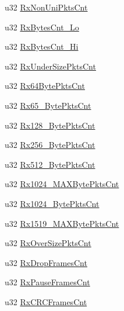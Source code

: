\begin{DoxyCompactItemize}
\item 
u32 \hyperlink{structECNT__SWITCHMGR__PORT__STATISTICS_af4107511aa6416ada6fb8f5ab804a76a}{Rx\+Non\+Uni\+Pkts\+Cnt}
\item 
u32 \hyperlink{structECNT__SWITCHMGR__PORT__STATISTICS_ac0b45dff11b31df7bf4781557fb20864}{Rx\+Bytes\+Cnt\+\_\+\+Lo}
\item 
u32 \hyperlink{structECNT__SWITCHMGR__PORT__STATISTICS_aa9bd997fe6eee98f0575efff84ddeb61}{Rx\+Bytes\+Cnt\+\_\+\+Hi}
\item 
u32 \hyperlink{structECNT__SWITCHMGR__PORT__STATISTICS_a60daa229a8191be4fa004277f547d19e}{Rx\+Under\+Size\+Pkts\+Cnt}
\item 
u32 \hyperlink{structECNT__SWITCHMGR__PORT__STATISTICS_af7bb439fdfa25e6e187d7aaf28cd3b13}{Rx64\+Byte\+Pkts\+Cnt}
\item 
u32 \hyperlink{structECNT__SWITCHMGR__PORT__STATISTICS_a7ab2ba04bc64db7762a64ca216f9b1f3}{Rx65\+\_\+Byte\+Pkts\+Cnt}
\item 
u32 \hyperlink{structECNT__SWITCHMGR__PORT__STATISTICS_a40cd08f32b4d07f8e2309d2a43cc5785}{Rx128\+\_\+Byte\+Pkts\+Cnt}
\item 
u32 \hyperlink{structECNT__SWITCHMGR__PORT__STATISTICS_a4f08ec2aeebcdcd852207076f82bf3e0}{Rx256\+\_\+Byte\+Pkts\+Cnt}
\item 
u32 \hyperlink{structECNT__SWITCHMGR__PORT__STATISTICS_a59398f2577cdade66f21c31d18ba17bb}{Rx512\+\_\+Byte\+Pkts\+Cnt}
\item 
u32 \hyperlink{structECNT__SWITCHMGR__PORT__STATISTICS_a2d22ba12b25939283bc594fec05e79cc}{Rx1024\+\_\+\+M\+A\+X\+Byte\+Pkts\+Cnt}
\item 
u32 \hyperlink{structECNT__SWITCHMGR__PORT__STATISTICS_afafbeaf98c99de7d49e600256b0d1b2e}{Rx1024\+\_\+Byte\+Pkts\+Cnt}
\item 
u32 \hyperlink{structECNT__SWITCHMGR__PORT__STATISTICS_aa88180ade29e2ce48b3d1e6f220e409e}{Rx1519\+\_\+\+M\+A\+X\+Byte\+Pkts\+Cnt}
\item 
u32 \hyperlink{structECNT__SWITCHMGR__PORT__STATISTICS_a2e7fabdc232e9b6790ac435c6dcac658}{Rx\+Over\+Size\+Pkts\+Cnt}
\item 
u32 \hyperlink{structECNT__SWITCHMGR__PORT__STATISTICS_a08b75eb16ace5175075527802625c04d}{Rx\+Drop\+Frames\+Cnt}
\item 
u32 \hyperlink{structECNT__SWITCHMGR__PORT__STATISTICS_a78864ab03e59a024e4b40041ea0d5b82}{Rx\+Pause\+Frames\+Cnt}
\item 
u32 \hyperlink{structECNT__SWITCHMGR__PORT__STATISTICS_a4741d36b69b6b4734dbe8d2f83aee2b2}{Rx\+C\+R\+C\+Frames\+Cnt}

\end{DoxyCompactItemize}
